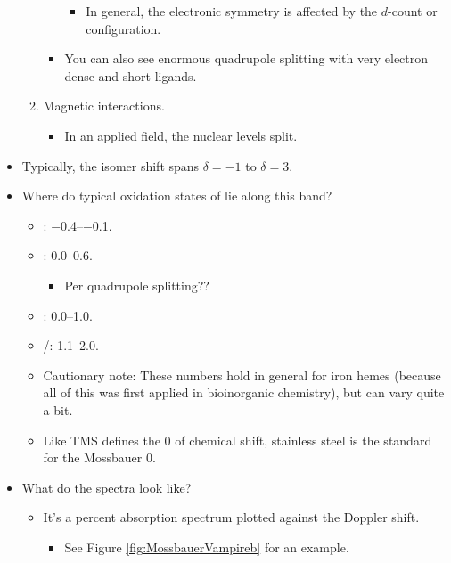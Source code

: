 \documentclass[../notes.tex]{subfiles}
\begin{document}
\begin{itemize}
\begin{enumerate}
\begin{itemize}
\begin{itemize}
                \item In general, the electronic symmetry is affected by the $d$-count or configuration.
            \end{itemize}
            \item You can also see enormous quadrupole splitting with very electron dense and short ligands.
        \end{itemize}
        \item Magnetic interactions.
        \begin{itemize}
            \item In an applied field, the nuclear levels split.
        \end{itemize}
    \end{enumerate}
    \item Typically, the isomer shift spans $\delta=-1$ to $\delta=3$.
    \item Where do typical oxidation states of  lie along this band?
    \begin{itemize}
        \item {}: \numrange[range-phrase={ to }]{-0.4}{-0.1}.
        \item {}: \numrange[range-phrase={ to }]{0.0}{0.6}.
        \begin{itemize}
            \item Per quadrupole splitting??
        \end{itemize}
        \item {}: \numrange[range-phrase={ to }]{0.0}{1.0}.
        \item {}/: \numrange[range-phrase={ to }]{1.1}{2.0}.
        \item Cautionary note: These numbers hold in general for iron hemes (because all of this was first applied in bioinorganic chemistry), but can vary quite a bit.
        \item Like TMS defines the 0 of chemical shift, stainless steel is the standard for the Mossbauer 0.
    \end{itemize}
    \item What do the spectra look like?
    \begin{itemize}
        \item It's a percent absorption spectrum plotted against the Doppler shift.
        \begin{itemize}
            \item See Figure \ref{fig:MossbauerVampireb} for an example.
        \end{itemize}

\end{itemize}
\end{itemize}
\end{document}
